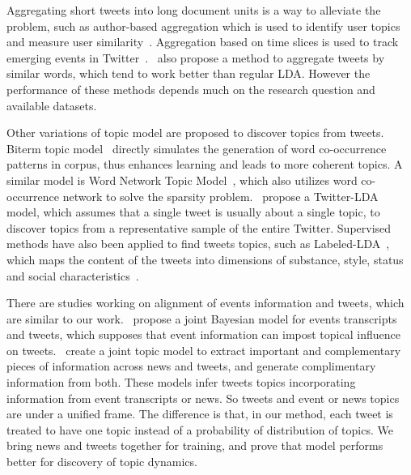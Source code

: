 Aggregating short tweets into long document units is a way to alleviate the problem, such as author-based aggregation which is used to identify user topics and measure user similarity~\cite{weng2010twitterrank}. Aggregation based on time slices is used to track emerging events in Twitter~\cite{lau2012line}.~ also propose a method to aggregate tweets by similar words, which tend to work better than regular LDA. However the performance of these methods depends much on the research question and available datasets.

Other variations of topic model are proposed to discover topics from tweets. Biterm topic model~\cite[BTM]{yan2013biterm} directly simulates the generation of word co-occurrence patterns in corpus, thus enhances learning and leads to more coherent topics. A similar model is Word Network Topic Model~\cite{zuo2014word}, which also utilizes word co-occurrence network to solve the sparsity problem.~ propose a Twitter-LDA model, which assumes that a single tweet is usually about a single topic, to discover topics from a representative sample of the entire Twitter. Supervised methods have also been applied to find tweets topics, such as Labeled-LDA~\cite{ramage2009labeled}, which maps the content of the tweets into dimensions of substance, style, status and social characteristics~\cite{ramage2010characterizing}.

There are studies working on alignment of events information and tweets, which are similar to our work.~ propose a joint Bayesian model for events transcripts and tweets, which supposes that event information can impost topical influence on tweets.~ create a joint topic model to extract important and complementary pieces of information across news and tweets, and generate complimentary information from both.
These models infer tweets topics incorporating information from event transcripts or news.
So tweets and event or news topics are under a unified frame.
The difference is that, in our method, each tweet is treated to have one topic instead of a probability of distribution of topics.
We bring news and tweets together for training, and prove that \stlda model performs better for discovery of topic dynamics.
